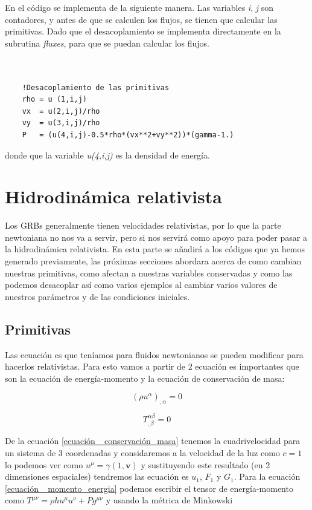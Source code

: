 \documentclass[12pt,a4paper]{book}
\begin{document}
En el código se implementa de la siguiente manera.
Las variables \emph{i}, \emph{j} son contadores, y antes de que se calculen los flujos, se tienen que calcular las primitivas. Dado que el desacoplamiento
se implementa directamente en la subrutina \emph{fluxes}, para que se puedan calcular los flujos.

\begin{lstlisting}[frame=single] 
  

    !Desacoplamiento de las primitivas
    rho = u (1,i,j)
    vx  = u(2,i,j)/rho
    vy  = u(3,i,j)/rho
    P   = (u(4,i,j)-0.5*rho*(vx**2+vy**2))*(gamma-1.)

\end{lstlisting}

donde que la variable \emph{u(4,i,j)} es la densidad de energía.
  
\section{Hidrodinámica relativista}
Los GRBs generalmente tienen velocidades relativistas, por lo que la parte newtoniana no nos va a servir, pero si nos servirá como apoyo para poder pasar a la hidrodinámica relativista.
En esta parte se añadirá a los códigos que ya hemos generado previamente, las próximas secciones abordara acerca de como cambian nuestras primitivas, como afectan a nuestras variables conservadas y como las podemos desacoplar así como varios ejemplos al cambiar varios valores de nuestros parámetros y de las condiciones iniciales.

\subsection{Primitivas}
Las ecuación  es que teníamos para fluidos newtonianos se pueden modificar para hacerlos relativistas. Para esto vamos a partir de 2 ecuación  es importantes que son la ecuación de energía-momento y la ecuación de conservación de masa:

\begin{equation}\label{ecuación  _conservación_masa}
\left( \rho u^{\alpha} \right)_{, \alpha} =0
\end{equation}

\begin{equation}\label{ecuación  _momento_energia}
T_{, \beta}^{\alpha \beta}=0
\end{equation}

De la ecuación \ref{ecuación  _conservación_masa} tenemos la cuadrivelocidad para un sistema de 
3 coordenadas y considaremos a la velocidad de la luz como $c=1$ lo podemos ver como $u^{\mu}=\gamma \left( 1, \textbf{v}\right)$ y sustituyendo este resultado (en 2 dimensiones espaciales) tendremos las ecuación  es $u_1$, $F_1$ y $G_1$. Para la ecuación \ref{ecuación  _momento_energia} podemos escribir el tensor de energía-momento como $T^{\mu \nu} = \rho h u^{\mu} u^{\nu} + Pg^{\mu \nu}$ y usando la métrica de Minkowski
\end{document}
